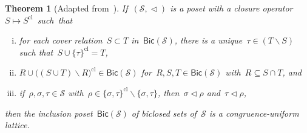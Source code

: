 \documentclass{memo-l}
\newtheorem{theorem}{Theorem}[part]
\theoremstyle{definition}
\newcommand{\cS}{\mathcal{S}} %
\newcommand{\ssm}{\smallsetminus} %
\newcommand{\closure}[1]{#1^{\mathrm{cl}}} %
\newcommand{\Bicl}[1]{\mathsf{Bic}(#1)} %
\begin{document}
\begin{theorem}[Adapted from~{\cite[Thm.~5.2 \& Thm.~5.5]{McConville}}]
\label{thm:characterizationCongruenceUniform2}
If~$(\cS, \vartriangleleft)$ is a poset with a closure operator~$S \mapsto \closure{S}$~such~that
\begin{enumerate}[(i)]
\item for each cover relation~$S \subset T$ in~$\Bicl{\cS}$, there is a unique~$\tau \in (T \ssm S)$ such that~${S \cup \closure{\{\tau\}} = T}$,
\item $R \cup \closure{\big((S \cup T) \ssm R\big)} \in \Bicl{\cS}$ for~$R,S,T \in \Bicl{\cS}$ with~$R \subseteq S \cap T$, and
\item if~$\rho,\sigma,\tau \in \cS$ with~$\rho \in \closure{\{\sigma,\tau\}} \ssm \{\sigma,\tau\}$, then~$\sigma \vartriangleleft \rho$ and~$\tau \vartriangleleft \rho$,
\end{enumerate}
then the inclusion poset~$\Bicl{\cS}$ of biclosed sets of~$\cS$ is a congruence-uniform lattice.
\end{theorem}
\end{document}
